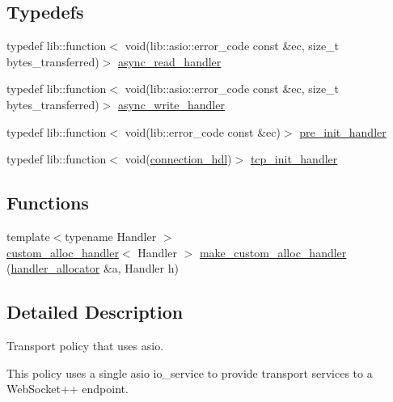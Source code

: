 \subsection*{Typedefs}
\begin{DoxyCompactItemize}
\item 
typedef lib\+::function$<$ void(lib\+::asio\+::error\+\_\+code const \&ec, size\+\_\+t bytes\+\_\+transferred)$>$ \hyperlink{namespacewebsocketpp_1_1transport_1_1asio_ac221bb77099f7ba684d4c39545d01116}{async\+\_\+read\+\_\+handler}
\item 
typedef lib\+::function$<$ void(lib\+::asio\+::error\+\_\+code const \&ec, size\+\_\+t bytes\+\_\+transferred)$>$ \hyperlink{namespacewebsocketpp_1_1transport_1_1asio_a989b4423e174cb815d9ea9f87910b287}{async\+\_\+write\+\_\+handler}
\item 
typedef lib\+::function$<$ void(lib\+::error\+\_\+code const \&ec)$>$ \hyperlink{namespacewebsocketpp_1_1transport_1_1asio_ad084554aff8b16e5c5d9a51ef82939cf}{pre\+\_\+init\+\_\+handler}
\item 
typedef lib\+::function$<$ void(\hyperlink{namespacewebsocketpp_a6b3d26a10ee7229b84b776786332631d}{connection\+\_\+hdl})$>$ \hyperlink{namespacewebsocketpp_1_1transport_1_1asio_ad12345b8638872037c87db068467233d}{tcp\+\_\+init\+\_\+handler}
\end{DoxyCompactItemize}
\subsection*{Functions}
\begin{DoxyCompactItemize}
\item 
{\footnotesize template$<$typename Handler $>$ }\\\hyperlink{classwebsocketpp_1_1transport_1_1asio_1_1custom__alloc__handler}{custom\+\_\+alloc\+\_\+handler}$<$ Handler $>$ \hyperlink{namespacewebsocketpp_1_1transport_1_1asio_a2ff04709483387d7b8c542dd7575f885}{make\+\_\+custom\+\_\+alloc\+\_\+handler} (\hyperlink{classwebsocketpp_1_1transport_1_1asio_1_1handler__allocator}{handler\+\_\+allocator} \&a, Handler h)
\end{DoxyCompactItemize}


\subsection{Detailed Description}
Transport policy that uses asio. 

This policy uses a single asio io\+\_\+service to provide transport services to a Web\+Socket++ endpoint. 


